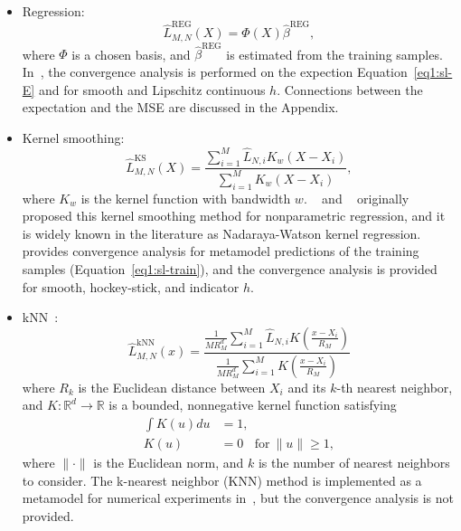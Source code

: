 \begin{itemize}
    \item   Regression:
            $$\hat{L}^{\text{REG}}_{M, N}(X) = \Phi(X) \hat{\beta}^{\text{REG}},$$
            where $\Phi$ is a chosen basis, and $\hat{\beta}^{\text{REG}}$ is estimated from the training samples.
            In~\cite{broadie2015risk}, the convergence analysis is performed on the expection Equation~\ref{eq1:sl-E} and for smooth and Lipschitz continuous $h$. 
            Connections between the expectation and the MSE are discussed in the Appendix.
    \item   Kernel smoothing:
            $$\hat{L}^{\text{KS}}_{M, N}(X) = \frac{\sum_{i=1}^M \hat{L}_{N, i} K_w(X - X_i)}{\sum_{i=1}^M K_w(X - X_i)}, $$
            where $K_w$ is the kernel function with bandwidth $w$.
            ~\cite{nadaraya1964estimating} and ~\cite{watson1964smooth} originally proposed this kernel smoothing method for nonparametric regression, and it is widely known in the literature as Nadaraya-Watson kernel regression.
            ~\cite{hong2017kernel} provides convergence analysis for metamodel predictions of the training samples (Equation~\ref{eq1:sl-train}), and the convergence analysis is provided for smooth, hockey-stick, and indicator $h$. 

    \item   kNN~\citep{mack1981local}:
            \begin{equation*}
            \hat{L}^{\text{kNN}}_{M, N}(x) 
            = \frac{\frac{1}{M R_M^d} \sum_{i=1}^M \hat{L}_{N, i} K\left(\frac{x - X_i}{R_M}\right)}{\frac{1}{M R_M^d} \sum_{i=1}^M K\left(\frac{x - X_i}{R_M}\right)}
            \end{equation*}
            where $R_k$ is the Euclidean distance between $X_i$ and its $k$-th nearest neighbor, and $K:\mathbb{R}^d \rightarrow \mathbb{R}$ is a bounded, nonnegative kernel function satisfying 
            \begin{align*}
                \int K(u) du & = 1, \\
                K(u) &= 0 ~~~ ~\text{for}~ \|u\| \geq 1,
            \end{align*}
            where $\|\cdot\|$ is the Euclidean norm, and  $k$ is the number of nearest neighbors to consider.
            The k-nearest neighbor (KNN) method is implemented as a metamodel for numerical experiments in~\cite{hong2017kernel}, but the convergence analysis is not provided.


\end{itemize}
